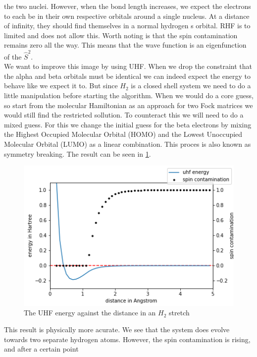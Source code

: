 \documentclass[twoside,twocolumn,9pt]{article}
\begin{document}
the two nuclei. However, when the bond length increases, we expect the electrons to each be in their own respective orbitals around a single nucleus. At a distance of infinity, they
should find themselves in a normal hydrogen s orbital. RHF is to limited and does not allow this. Worth noting is that the spin contamination remains zero all the way. This means
that the wave function is an eigenfunction of the $\hat{S}^2$\cite{Scuseria2011}. \\
We want to improve this image by using UHF.  When we drop the constraint that the alpha and beta orbitals must be identical we can indeed expect the energy to behave like we expect
it to. But since $H_2$ is a closed shell system we need to do a little manipulation before starting the algorithm. When we would do a core guess, so start from the molecular
Hamiltonian as an approach for two Fock matrices we would still find the restricted sollution. To counteract this we will need to do a mixed guess. For this we change the initial
guess for the beta electrons by mixing the Highest Occupied Molecular Orbital (HOMO) and the Lowest Unoccupied Molecular Orbital (LUMO) as a linear combination. This proces is also
known as symmetry breaking. The result can be seen in \ref{fig:uhfstretch}.
\begin{center}
  \begin{figure}[h]
    \includegraphics[width=\linewidth]{./../notes/figures/uhf.png}
    \caption{The UHF energy against the distance in an $H_2$ stretch}
    \label{fig:uhfstretch}
  \end{figure}
\end{center}
This result is physically more acurate. We see that the system does evolve towards two separate hydrogen atoms. However, the spin contamination is rising, and after a certain point
\end{document}
